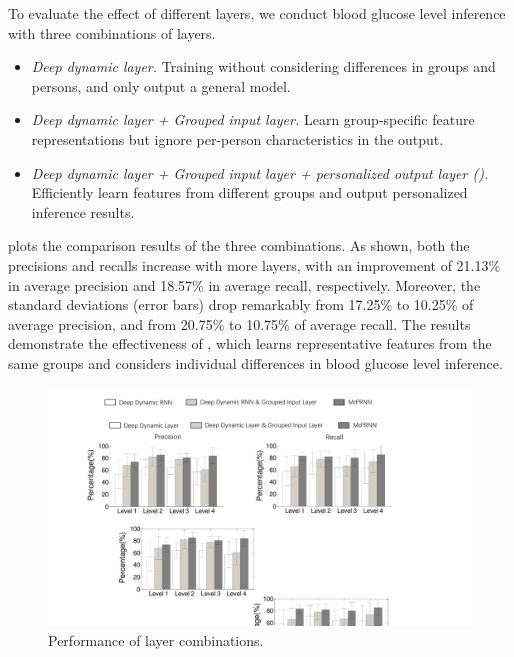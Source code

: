 To evaluate the effect of different layers, we conduct blood glucose level inference with three combinations of layers.
\begin{itemize}
  \item
  \emph{Deep dynamic layer.}
  Training without considering differences in groups and persons, and only output a general model.
  \item
  \emph{Deep dynamic layer + Grouped input layer.}
  Learn group-specific feature representations but ignore per-person characteristics in the output.
  \item
  \emph{Deep dynamic layer + Grouped input layer + personalized output layer (\modelname).}
  Efficiently learn features from different groups and output personalized inference results.
\end{itemize}
 plots the comparison results of the three combinations.
As shown, both the precisions and recalls increase with more layers, with an improvement of 21.13\% in average precision and 18.57\% in average recall, respectively.
Moreover, the standard deviations (error bars) drop remarkably from 17.25\% to 10.25\%  of average precision, and from 20.75\% to 10.75\% of average recall.
The results demonstrate the effectiveness of \modelname, which learns representative features from the same groups and considers individual differences in blood glucose level inference.

\begin{figure}[h]
  \centering
  \includegraphics[width=0.8\columnwidth]{./img/CMP_Models2.pdf}
  \caption{Performance of layer combinations. }
  \label{fig:cmp_model}
\end{figure}

